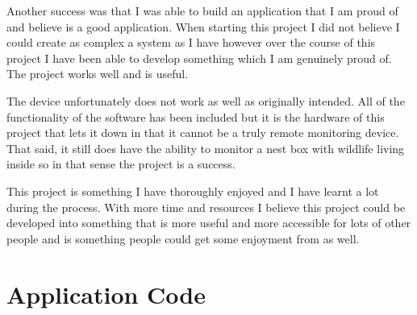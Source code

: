 \documentclass[10pt,a4paper]{article}
\begin{document}
Another success was that I was able to build an application that I am proud of and believe is a good application. When starting this project I did not believe I could create as complex a system as I have however over the course of this project I have been able to develop something which I am genuinely proud of. The project works well and is useful. 

The device unfortunately does not work as well as originally intended. All of the functionality of the software has been included but it is the hardware of this project that lets it down in that it cannot be a truly remote monitoring device. That said, it still does have the ability to monitor a nest box with wildlife living inside so in that sense the project is a success.

This project is something I have thoroughly enjoyed and I have learnt a lot during the process. With more time and resources I believe this project could be developed into something that is more useful and more accessible for lots of other people and is something people could get some enjoyment from as well. 

\pagebreak




\pagebreak
\listoffigures
\pagebreak
\listoftables
\pagebreak

\appendix
\section{Application Code}
\end{document}
